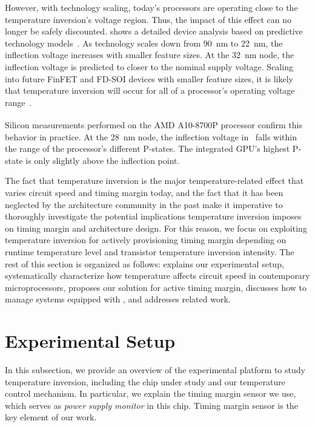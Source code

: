 However, with technology scaling, today's processors are operating close to the temperature inversion's voltage region. Thus, the impact of this effect can no longer be safely discounted.  shows a detailed device analysis based on predictive technology models~\cite{wolpert2012temperature,zhao2006new}. As technology scales down from 90~nm to 22~nm, the inflection voltage increases with smaller feature sizes. At the 32~nm node, the inflection voltage is predicted to closer to the nominal supply voltage. Scaling into future FinFET and FD-SOI devices with smaller feature sizes, it is likely that temperature inversion will occur for all of a processor's operating voltage range~\cite{lee2014dynamic,cai2015tei}.

Silicon measurements performed on the AMD\textsuperscript{\textregistered} A10-8700P processor confirm this behavior in practice. At the 28~nm node, the inflection voltage in~ falls within the range of the processor's different P-states. The integrated GPU's highest P-state is only slightly above the inflection point. 

The fact that temperature inversion is the major temperature-related effect that varies circuit speed and timing margin today, and the fact that it has been neglected by the architecture community in the past make it imperative to thoroughly investigate the potential implications temperature inversion imposes on timing margin and architecture design. For this reason, we focus on exploiting temperature inversion for actively provisioning timing margin depending on runtime temperature level and transistor temperature inversion intensity. The rest of this section is organized as follows:  explains our experimental setup,  systematically characterize how temperature affects circuit speed in contemporary microprocessors,  proposes our \tistate solution for active timing margin,  discusses how to manage systems equipped with \tistates, and  addresses related work.

\section{Experimental Setup}
\label{sec:temperature:setup}

In this subsection, we provide an overview of the experimental platform to study temperature inversion, including the chip under study and our temperature control mechanism. In particular, we explain the timing margin sensor we use, which serves as \textit{power supply monitor} in this chip. Timing margin sensor is the key element of our work.

